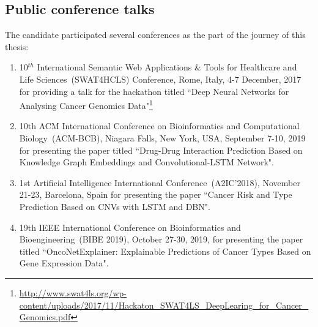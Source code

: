 
\subsection{Public conference talks}
The candidate participated several conferences as the part of the journey of this thesis: 
\begin{enumerate}[noitemsep]
    \item 10$^{th}$ International Semantic Web Applications \& Tools for Healthcare and Life Sciences~(SWAT4HCLS) Conference, Rome, Italy, 4-7 December, 2017 for providing a talk for the hackathon titled ``Deep Neural Networks for Analysing Cancer Genomics Data"\footnote{\url{http://www.swat4ls.org/wp-content/uploads/2017/11/Hackaton_SWAT4LS_DeepLearing_for_Cancer_Genomics.pdf}}
	\item 10th ACM International Conference on Bioinformatics and Computational Biology~(ACM-BCB), Niagara Falls, New York, USA, September 7-10, 2019 for presenting the paper titled ``Drug-Drug Interaction Prediction Based on Knowledge Graph Embeddings and Convolutional-LSTM Network".
	\item 1st Artificial Intelligence International Conference~(A2IC'2018), November 21-23, Barcelona, Spain for presenting the paper ``Cancer Risk and Type Prediction Based on CNVs with LSTM and DBN". 
	\item 19th IEEE International Conference on Bioinformatics and Bioengineering~(BIBE 2019), October 27-30, 2019, for presenting the paper titled ``OncoNetExplainer: Explainable Predictions of Cancer Types Based on Gene Expression Data".
\end{enumerate}

